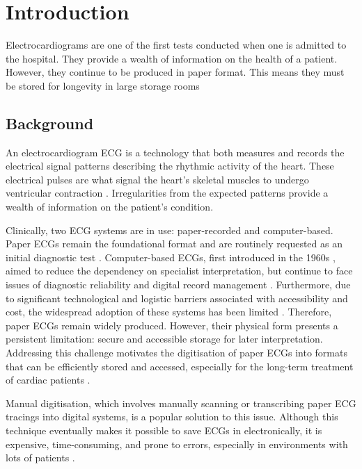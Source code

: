 
\glsresetall %
\chapter[Introduction]{Introduction}\label{ch:Introduction}

Electrocardiograms are one of the first tests conducted when one is admitted to the hospital. They provide a wealth of information on the health of a patient. However, they continue to be produced in paper format. This means they must be stored for longevity in large storage rooms

\section{Background}
An electrocardiogram \gls{ECG} is a technology that both measures and records the electrical signal patterns describing the rhythmic activity of the heart. These electrical pulses are what signal the heart's skeletal muscles to undergo ventricular contraction \cite{AlGhatrif2012}. Irregularities from the expected patterns provide a wealth of information on the patient's condition.

Clinically, two ECG systems are in use: paper-recorded and computer-based. Paper ECGs remain the foundational format and are routinely requested as an initial diagnostic test \cite{AlGhatrif2012}. Computer-based ECGs, first introduced in the 1960s \cite{Medved2020CriticalAO}, aimed to reduce the dependency on specialist interpretation, but continue to face issues of diagnostic reliability and digital record management \cite{Heaney2022InternetOT}. Furthermore, due to significant technological and logistic barriers associated with accessibility and cost, the widespread adoption of these systems has been limited \cite{Rubbo2015UseOE}\cite{Qiu2023AutomatedCR}. Therefore, paper ECGs remain widely produced. However, their physical form presents a persistent limitation: secure and accessible storage for later interpretation. Addressing this challenge motivates the digitisation of paper ECGs into formats that can be efficiently stored and accessed, especially for the long-term treatment of cardiac patients \cite{Ravichandran2013NovelTF}.

Manual digitisation, which involves manually scanning or transcribing paper ECG tracings into digital systems, is a popular solution to this issue.  Although this technique eventually makes it possible to save ECGs in electronically, it is expensive, time-consuming, and prone to errors, especially in environments with lots of patients \cite{Eapen2016MobileHealthCardioEHR}. %

